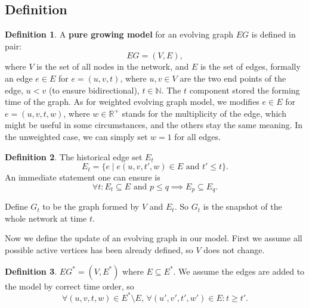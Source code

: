 \documentclass[12pt,abstract=true]{scrartcl}
\numberwithin{equation}{section}
\theoremstyle{definition}   \newtheorem{definition}{Definition}[section]
\theoremstyle{plain}        \newtheorem{theorem}{Theorem}[section]
\theoremstyle{plain}        \newtheorem{observation}{Observation}[section]
\theoremstyle{plain}        \newtheorem{fact}{Fact}[section]
\theoremstyle{plain}        \newtheorem{claim}{Claim}[section]
\theoremstyle{plain}        \newtheorem{lemma}[theorem]{Lemma}
\theoremstyle{plain}        \newtheorem{corollary}[theorem]{Corollary}
\theoremstyle{remark}       \newtheorem{example}{Example}[section]
\theoremstyle{remark}       \newtheorem{remark}{Remark}[section]
\begin{document}
\subsection{Definition}
\begin{definition}
A \textbf{pure growing model} for an evolving graph $EG$ is defined in pair:
\begin{equation}
EG=(V,E),
\end{equation}
where $V$ is the set of all nodes in the network, and $E$ is the set of edges,
formally an edge $e\in E$ for $e=(u,v,t)$, where $u,v\in V$ are the two end
points of the edge, $u<v$ (to ensure bidirectional), $t\in \mathbb{N}$. The $t$
component stored the forming time of the graph. As for weighted evolving graph
model, we modifies $e\in E$ for $e=(u,v,t,w)$, where $w\in\mathbb{R}^+$ stands
for the multiplicity of the edge, which might be useful in some circumstances,
and the others stay the same meaning. In the unweighted case, we can simply set
$w=1$ for all edges.
\end{definition}

\begin{definition}
The historical edge set $E_t$
\begin{equation}
E_t=\{e\;|\;e(u,v,t',w)\in E\text{ and }t'\leq t\}.
\end{equation}
An immediate statement one can ensure is
\begin{equation}
\forall t: E_t\subseteq E\text{ and }p\leq q\implies E_p\subseteq E_q.
\end{equation}

Define $G_t$ to be the graph formed by $V$ and $E_t$. So $G_t$ is the snapshot
of the whole network at time $t$.
\end{definition}

Now we define the update of an evolving graph in our model. First we assume all
possible active vertices has been already defined, so $V$ does not change.

\begin{definition}
$EG^*=(V,E^*)$ where $E\subseteq E^*$. We assume the edges are added to the
model by correct time order, so
\begin{equation}
\forall (u,v,t,w) \in E^*\setminus E,\, \forall (u',v',t',w')\in E: t \geq t'.
\end{equation}
\end{definition}
\end{document}
